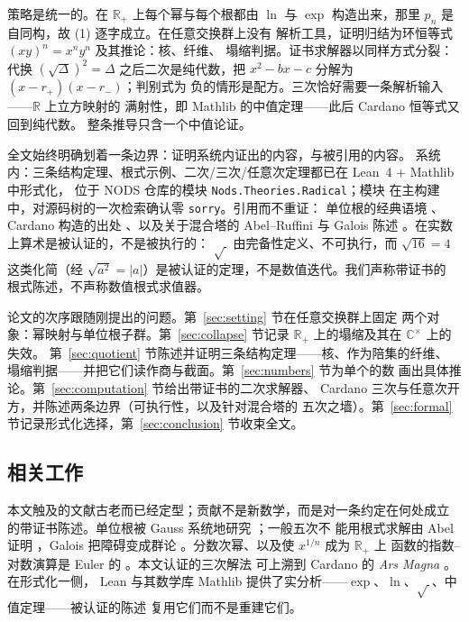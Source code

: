 \documentclass[submission,noinfoline]{jsfds}
\newcommand{\abs}[1]{\lvert #1\rvert}
\begin{document}
策略是统一的。在 $\mathbb R_+$ 上每个幂与每个根都由 $\ln$ 与 $\exp$
构造出来，那里 $p_n$ 是自同构，故 (1) 逐字成立。在任意交换群上没有
解析工具，证明归结为环恒等式 $(xy)^n=x^ny^n$ 及其推论：核、纤维、
塌缩判据。证书求解器以同样方式分裂：代换 $(\sqrt\Delta)^2=\Delta$
之后二次是纯代数，把 $x^2-bx-c$ 分解为 $(x-r_+)(x-r_-)$；判别式为
负的情形是配方。三次恰好需要一条解析输入——$\mathbb R$ 上立方映射的
满射性，即 Mathlib 的中值定理——此后 Cardano 恒等式又回到纯代数。
整条推导只含一个中值论证。

全文始终明确划着一条边界：证明系统内证出的内容，与被引用的内容。
系统内：三条结构定理、根式示例、二次/三次/任意次定理都已在 Lean~4
\citep{deMoura2015} + Mathlib \citep{MathlibCommunity2020} 中形式化，
位于 NODS 仓库的模块 \texttt{Nods.Theories.\allowbreak Radical}；模块
在主构建中，对源码树的一次检索确认零 \texttt{sorry}。引用而不重证：
单位根的经典语境 \citep{Gauss1801}、Cardano 构造的出处
\citep{Cardano1545}、以及关于混合塔的 Abel--Ruffini 与 Galois 陈述
\citep{Abel1824,Galois1846}。在实数上算术是被认证的，不是被执行的：
$\sqrt{\,}$ 由完备性定义、不可执行，而 $\sqrt{16}=4$ 这类化简（经
$\sqrt{a^2}=\abs a$）是被认证的定理，不是数值迭代。我们声称带证书的
根式陈述，不声称数值根式求值器。

论文的次序跟随刚提出的问题。第~\ref{sec:setting} 节在任意交换群上固定
两个对象：幂映射与单位根子群。第~\ref{sec:collapse} 节记录
$\mathbb R_+$ 上的塌缩及其在 $\mathbb C^\times$ 上的失效。
第~\ref{sec:quotient} 节陈述并证明三条结构定理——核、作为陪集的纤维、
塌缩判据——并把它们读作商与截面。第~\ref{sec:numbers} 节为单个的数
画出具体推论。第~\ref{sec:computation} 节给出带证书的二次求解器、
Cardano 三次与任意次开方，并陈述两条边界（可执行性，以及针对混合塔的
五次之墙）。第~\ref{sec:formal} 节记录形式化选择，第~\ref{sec:conclusion}
节收束全文。

\subsection{相关工作}

本文触及的文献古老而已经定型；贡献不是新数学，而是对一条约定在何处成立
的带证书陈述。单位根被 Gauss 系统地研究 \citep{Gauss1801}；一般五次不
能用根式求解由 Abel 证明 \citep{Abel1824}，Galois 把障碍变成群论
\citep{Galois1846}。分数次幂、以及使 $x^{1/n}$ 成为 $\mathbb R_+$ 上
函数的指数--对数演算是 Euler 的 \citep{Euler1748}。本文认证的三次解法
可上溯到 Cardano 的 \emph{Ars Magna} \citep{Cardano1545}。在形式化一侧，
Lean \citep{deMoura2015} 与其数学库 Mathlib \citep{MathlibCommunity2020}
提供了实分析——$\exp$、$\ln$、$\sqrt{\,}$、中值定理——被认证的陈述
复用它们而不是重建它们。
\end{document}
